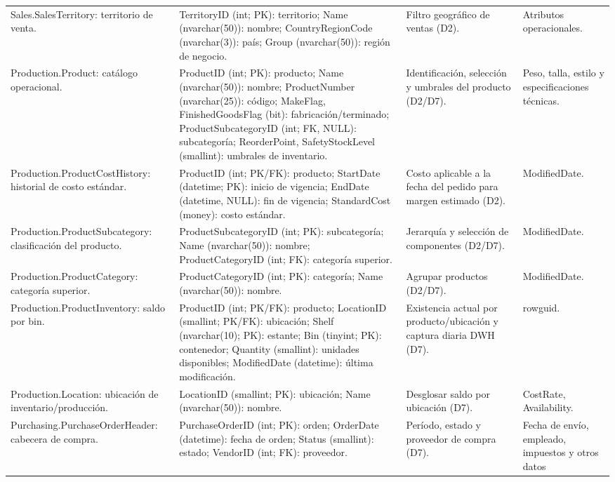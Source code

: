 \documentclass[10pt,a4paper]{article}
\begin{document}
\begin{longtable}{p{}p{}p{}p{}}
Sales.\allowbreak SalesTerritory: territorio de venta. &
TerritoryID (int; PK): territorio; Name (nvarchar(50)): nombre;
CountryRegionCode (nvarchar(3)): país; Group (nvarchar(50)): región de
negocio. & Filtro geográfico de ventas (D2). & Atributos operacionales.\\
Production.\allowbreak Product: catálogo operacional. &
ProductID (int; PK): producto; Name (nvarchar(50)): nombre;
ProductNumber (nvarchar(25)): código; MakeFlag, FinishedGoodsFlag (bit):
fabricación/terminado; ProductSubcategoryID (int; FK, NULL): subcategoría;
ReorderPoint, SafetyStockLevel (smallint): umbrales de inventario. &
Identificación, selección y umbrales del producto (D2/D7). & Peso, talla,
estilo y especificaciones técnicas.\\
Production.\allowbreak ProductCostHistory: historial de costo estándar. &
ProductID (int; PK/FK): producto; StartDate (datetime; PK): inicio de
vigencia; EndDate (datetime, NULL): fin de vigencia; StandardCost (money):
costo estándar. & Costo aplicable a la fecha del pedido para margen estimado
(D2). & ModifiedDate.\\
Production.\allowbreak ProductSubcategory: clasificación del producto. &
ProductSubcategoryID (int; PK): subcategoría; Name (nvarchar(50)): nombre;
ProductCategoryID (int; FK): categoría superior. & Jerarquía y selección de
componentes (D2/D7). & ModifiedDate.\\
Production.\allowbreak ProductCategory: categoría superior. &
ProductCategoryID (int; PK): categoría; Name (nvarchar(50)): nombre. &
Agrupar productos (D2/D7). & ModifiedDate.\\
Production.\allowbreak ProductInventory: saldo por bin. &
ProductID (int; PK/FK): producto; LocationID (smallint; PK/FK): ubicación;
Shelf (nvarchar(10); PK): estante; Bin (tinyint; PK): contenedor;
Quantity (smallint): unidades disponibles; ModifiedDate (datetime): última
modificación. & Existencia actual por producto/ubicación y captura diaria
DWH (D7). & rowguid.\\
Production.\allowbreak Location: ubicación de inventario/producción. &
LocationID (smallint; PK): ubicación; Name (nvarchar(50)): nombre. &
Desglosar saldo por ubicación (D7). & CostRate, Availability.\\
Purchasing.\allowbreak PurchaseOrderHeader: cabecera de compra. &
PurchaseOrderID (int; PK): orden; OrderDate (datetime): fecha de orden;
Status (smallint): estado; VendorID (int; FK): proveedor. & Período, estado y
proveedor de compra (D7). & Fecha de envío, empleado, impuestos y otros datos

\end{longtable}
\end{document}
